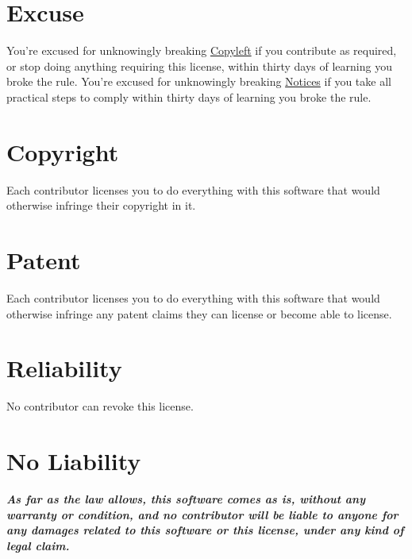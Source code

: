 \documentclass[12pt,letterpaper]{article}
\begin{document}
\section*{Excuse}

You're excused for unknowingly breaking \hyperlink{Copyleft}{Copyleft} if you contribute as required, or stop doing anything requiring this license, within thirty days of learning you broke the rule. You're excused for unknowingly breaking \hyperlink{Notices}{Notices} if you take all practical steps to comply within thirty days of learning you broke the rule.

\section*{Copyright}

Each contributor licenses you to do everything with this software that would otherwise infringe their copyright in it.

\section*{Patent}

Each contributor licenses you to do everything with this software that would otherwise infringe any patent claims they can license or become able to license.

\section*{Reliability}

No contributor can revoke this license.

\section*{No Liability}

\textbf{\emph{As far as the law allows, this software comes as is, without any warranty or condition, and no contributor will be liable to anyone for any damages related to this software or this license, under any kind of legal claim.}}
\end{document}
